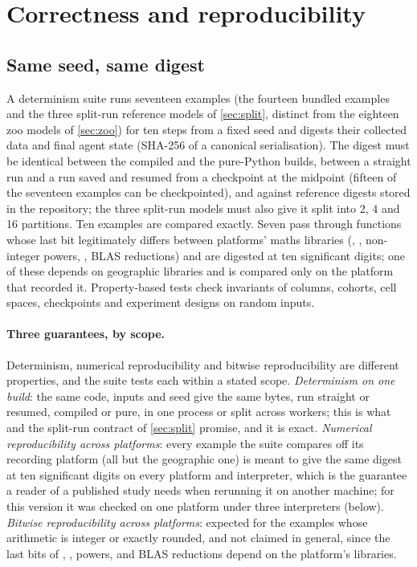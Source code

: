 \section{Correctness and reproducibility}
\label{sec:reproducibility}

\subsection{Same seed, same digest}

A determinism suite runs seventeen examples (the fourteen bundled examples
and the three split-run reference models of \cref{sec:split}, distinct from the eighteen
zoo models of \cref{sec:zoo}) for ten steps from a fixed seed and
digests their collected data and final agent state (SHA-256 of a canonical serialisation).
The digest must be identical between the compiled and the pure-Python builds, between a
straight run and a run saved and resumed from a checkpoint at the midpoint (fifteen of the
seventeen examples can be checkpointed), and against reference digests stored in the
repository; the three split-run models must also give it split into 2, 4 and 16 partitions.
Ten examples are compared exactly. Seven pass through functions whose last bit legitimately differs between
platforms' maths libraries (, , non-integer powers, , BLAS
reductions) and are digested at ten significant digits; one of these depends on geographic
libraries and is compared only on the platform that recorded it. Property-based tests check
invariants of columns, cohorts, cell spaces, checkpoints and experiment designs on random
inputs.

\paragraph{Three guarantees, by scope.} Determinism, numerical reproducibility and bitwise
reproducibility are different properties, and the suite tests each within a stated scope.
\emph{Determinism on one build}: the same code, inputs and seed give the same bytes, run
straight or resumed, compiled or pure, in one process or split across workers; this is what
 and the split-run contract of \cref{sec:split} promise, and it is
exact. \emph{Numerical reproducibility across platforms}: every example the suite compares off
its recording platform (all but the geographic one) is meant to give the same digest at ten
significant digits on every platform and interpreter, which is the guarantee a reader of a
published study needs when rerunning it on another machine; for this version it was
checked on one platform under three interpreters (below).
\emph{Bitwise reproducibility across platforms}: expected for the examples whose arithmetic
is integer or exactly rounded, and not claimed in general, since the last bits of , , powers,  and BLAS
reductions depend on the platform's libraries.

